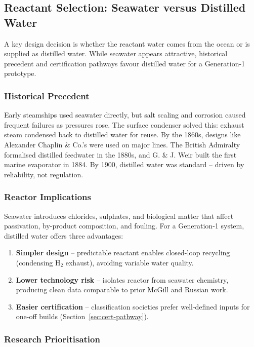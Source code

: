 \documentclass[12pt]{article}
\begin{document}
\break

\subsection{Reactant Selection: Seawater versus Distilled Water}

A key design decision is whether the reactant water comes from the ocean or is supplied as distilled water. While seawater appears attractive, historical precedent and certification pathways favour distilled water for a Generation-1 prototype.

\subsubsection*{Historical Precedent}

Early steamships used seawater directly, but salt scaling and corrosion caused frequent failures as pressures rose. The surface condenser solved this: exhaust steam condensed back to distilled water for reuse. By the 1860s, designs like Alexander Chaplin \& Co.'s were used on major lines. The British Admiralty formalised distilled feedwater in the 1880s, and G. \& J. Weir built the first marine evaporator in 1884. By 1900, distilled water was standard – driven by reliability, not regulation.

\subsubsection*{Reactor Implications}

Seawater introduces chlorides, sulphates, and biological matter that affect passivation, by-product composition, and fouling. For a Generation-1 system, distilled water offers three advantages:

\begin{enumerate}
    \item \textbf{Simpler design} – predictable reactant enables closed-loop recycling (condensing H$_2$ exhaust), avoiding variable water quality.
    \item \textbf{Lower technology risk} – isolates reactor from seawater chemistry, producing clean data comparable to prior McGill and Russian work.
    \item \textbf{Easier certification} – classification societies prefer well-defined inputs for one-off builds (Section~\ref{sec:cert-pathway}).
\end{enumerate}

\subsubsection*{Research Prioritisation}
\end{document}

